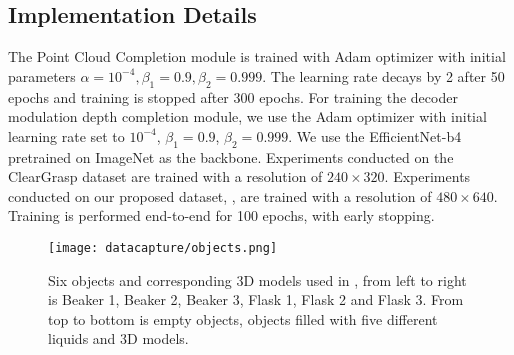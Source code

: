 \subsection{Implementation Details}


The Point Cloud Completion module is trained with Adam optimizer\citep{kingma2017adam} with initial parameters $\alpha = 10^{-4}, \beta_1 = 0.9, \beta_2=0.999$. The learning rate decays by 2 after 50 epochs and training is stopped after 300 epochs. For training the decoder modulation depth completion module, we use the Adam optimizer \citep{kingma2017adam} with initial learning rate set to $10^{-4}$, $\beta_1 = 0.9$, $\beta_2 = 0.999$. We use the EfficientNet-b4 \citep{tan2020efficientnet} pretrained on ImageNet \citep{russakovsky2015imagenet} as the backbone. Experiments conducted on the ClearGrasp \citep{ClearGrasp} dataset are trained with a resolution of $240 \times 320$. Experiments conducted on our proposed dataset, \dataName, are trained with a resolution of $480 \times 640$. Training is performed end-to-end for 100 epochs, with early stopping.





\begin{figure}
    \centering
    \texttt{[image: datacapture/objects.png]}
    \caption{Six objects and corresponding 3D models used in \dataName, from left to right is Beaker 1, Beaker 2, Beaker 3, Flask 1, Flask 2 and Flask 3. From top to bottom is empty objects, objects filled with five different liquids and 3D models. }
    \label{fig:my_label}
\end{figure}
